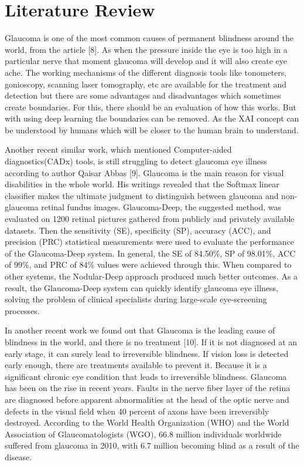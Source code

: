\documentclass[conference]{IEEEtran}
\begin{document}
\section{Literature Review}
Glaucoma is one of the most common causes of permanent blindness around the world, from the article [8]. As when the pressure inside the eye is too high in a particular nerve that moment glaucoma will develop and it will also create eye ache. The working mechanisms of the different diagnosis tools like tonometers, gonioscopy, scanning laser tomography, etc are available for the treatment and detection but there are some advantages and disadvantages which sometimes create boundaries. For this, there should be an evaluation of how this works. But with using deep learning the boundaries can be removed. As the XAI concept can be understood by humans which will be closer to the human brain to understand. 

\noindent Another recent similar work, which mentioned Computer-aided diagnostics(CADx) tools, is still struggling to detect glaucoma eye illness according to author Qaisar Abbas [9]. Glaucoma is the main reason for visual disabilities in the whole world. His writings revealed that the Softmax linear classifier makes the ultimate judgment to distinguish between glaucoma and non-glaucoma retinal fundus images. Glaucoma-Deep, the suggested method, was evaluated on 1200 retinal pictures gathered from publicly and privately available datasets. Then the sensitivity (SE), specificity (SP), accuracy (ACC), and precision (PRC) statistical measurements were used to evaluate the performance of the Glaucoma-Deep system. In general, the SE of 84.50\%, SP of 98.01\%, ACC of 99\%, and PRC of 84\% values were achieved through this. When compared to other systems, the Nodular-Deep approach produced much better outcomes. As a result, the Glaucoma-Deep system can quickly identify glaucoma eye illness, solving the problem of clinical specialists during large-scale eye-screening processes. 

\noindent In another recent work we found out that Glaucoma is the leading cause of blindness in the world, and there is no treatment [10]. If it is not diagnosed at an early stage, it can surely lead to irreversible blindness. If vision loss is detected early enough, there are treatments available to prevent it. Because it is a significant chronic eye condition that leads to irreversible blindness. Glaucoma has been on the rise in recent years. Faults in the nerve fiber layer of the retina are diagnosed before apparent abnormalities at the head of the optic nerve and defects in the visual field when 40 percent of axons have been irreversibly destroyed. According to the World Health Organization (WHO) and the World Association of Glaucomatologists (WGO), 66.8 million individuals worldwide suffered from glaucoma in 2010, with 6.7 million becoming blind as a result of the disease.
\end{document}
